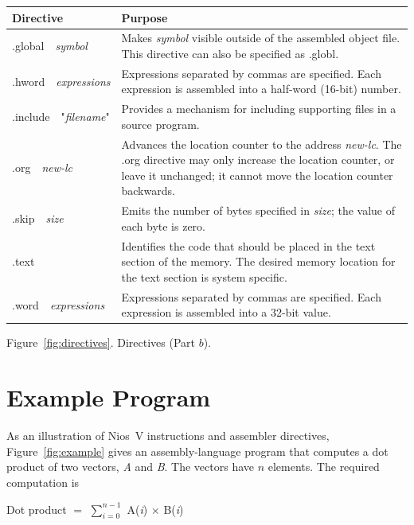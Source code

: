 \documentclass[11pt, twoside, pdftex]{article}
\begin{document}
\begin{center}
\begin{tabular}{p{.22\linewidth}|p{.7\linewidth}}
{\bf Directive} & {\bf Purpose} \\ \hline
\rule[-0.075in]{0in}{0.33in}{\sf .global}~~{\it symbol} & 
Makes {\it symbol} visible outside of the assembled object file.
This directive can also be specified as {\sf .globl}.\\
\rule[-0.075in]{0in}{0.33in}{\sf .hword}~~{\it expressions} & 
Expressions separated by commas are specified. Each expression is assembled into
a half-word (16-bit) number.\\
\rule[-0.075in]{0in}{0.33in}{\sf .include}~~"{\it filename}" &
Provides a mechanism for including supporting files in a source program.\\
\rule[-0.075in]{0in}{0.33in}{\sf .org}~~{\it new-lc} &
Advances the location counter to the address {\it new-lc}.
The {\sf .org} directive may only increase the location counter, or leave it unchanged; 
it cannot move the location counter backwards.\\
\rule[-0.075in]{0in}{0.33in}{\sf .skip}~~{\it size} & 
Emits the number of bytes specified in {\it size}; the value of each byte is zero.\\
\rule[-0.075in]{0in}{0.33in}{\sf .text} & 
Identifies the code that should be placed in the text section of the memory.
The desired memory location for the text section is system specific.\\
\rule[-0.075in]{0in}{0.33in}{\sf .word}~~{\it expressions} &
Expressions separated by commas are specified. Each expression is assembled into
a 32-bit value.
\end{tabular}

\vspace{0.25in}
Figure~\ref{fig:directives}. Directives (Part $b$).
\end{center}

\section{Example Program}

As an illustration of Nios~V instructions and assembler directives, 
Figure~\ref{fig:example} gives an assembly-language program
that computes a dot product of two vectors, {\it A} and {\it B}. The vectors
have $n$ elements. The required computation is
\begin{center}
Dot product $=$ $\sum_{i = 0}^{n - 1}$ A({\it i}) $\times$ B({\it i})
\end{center}
\end{document}
